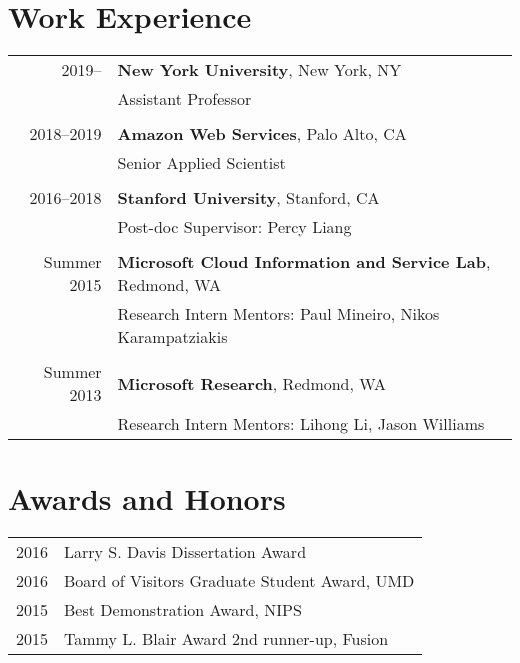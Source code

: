\documentclass[a4paper,11pt]{article}
\begin{document}
\section{Work Experience}
\begin{tabular}{rl}    
2019--   & \textbf{New York University}, New York, NY \\
    & Assistant Professor \\
\\
2018--2019  & \textbf{Amazon Web Services}, Palo Alto, CA \\
    & Senior Applied Scientist \\
\\
2016--2018 & \textbf{Stanford University}, Stanford, CA\\
& Post-doc \hspace{2em} Supervisor: Percy Liang \\
\\
Summer 2015 & {\bf Microsoft Cloud Information and Service Lab}, Redmond, WA\\
& Research Intern \hspace{2em} Mentors: Paul Mineiro, Nikos Karampatziakis\\
\\
Summer 2013 & {\bf Microsoft Research}, Redmond, WA\\
& Research Intern \hspace{2em} Mentors: Lihong Li, Jason Williams
\end{tabular}

\section{Awards and Honors}
\begin{tabular}{rl}    
2016 & Larry S. Davis Dissertation Award\\
2016 & Board of Visitors Graduate Student Award, UMD\\
2015 & Best Demonstration Award, NIPS\\
2015 & Tammy L. Blair Award 2nd runner-up, Fusion\\
\end{tabular}
\end{document}

